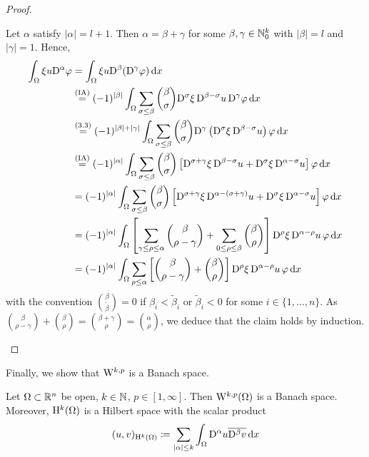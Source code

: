 \begin{proof}
\begin{enumerate}
      Let $\alpha$ satisfy $|\alpha| = l+1$.
      Then $\alpha  = \beta + \gamma$ for some $\beta, \gamma \in \mathbb{N}_0^k$ with $|\beta| = l$ and $|\gamma| = 1$.
      Hence,
      \begin{align*}
        \int_\Omega \xi u \mathrm{D}^\alpha \varphi
        &= \int_\Omega \xi u\mathrm{D}^\beta (\mathrm{D}^\gamma \varphi ) \, {\operatorname{d}\!{x}} \\
        &\overset{\mathrm{(IA)}}{=} (-1)^{|\beta|} \int_\Omega \sum_{\sigma \leq \beta} \binom{\beta}{\sigma} \mathrm{D}^\sigma \xi\, \mathrm{D}^{\beta - \sigma} u\, \mathrm{D}^\gamma \varphi \, {\operatorname{d}\!{x}} \\
        &\overset{(3.3)}{=} (-1)^{|\beta|+|\gamma|} \int_\Omega \sum_{\sigma \leq \beta} \binom{\beta}{\sigma} \mathrm{D}^\gamma \left( \mathrm{D}^\sigma \xi \, \mathrm{D}^{\beta - \sigma} u \right) \varphi \, {\operatorname{d}\!{x}} \\
        &\overset{\mathrm{(IA)}}{=} (-1)^{|\alpha|} \int_\Omega \sum_{\sigma \leq \beta} \binom{\beta}{\sigma} \left[ \mathrm{D}^{\sigma + \gamma} \xi\, \mathrm{D}^{\beta - \sigma} u + \mathrm{D}^\sigma \xi \,\mathrm{D}^{\alpha - \sigma} u \right] \varphi \, {\operatorname{d}\!{x}}\\
        &= (-1)^{|\alpha|} \int_\Omega \sum_{\sigma \leq \beta} \binom{\beta}{\sigma} \left[ \mathrm{D}^{\sigma + \gamma} \xi\, \mathrm{D}^{\alpha - (\sigma + \gamma)} u + \mathrm{D}^\sigma \xi \,\mathrm{D}^{\alpha - \sigma} u \right] \varphi \, {\operatorname{d}\!{x}}\\
        &= (-1)^{|\alpha|} \int_\Omega \left [\sum_{\gamma \leq \rho \leq \alpha} \binom{\beta}{\rho - \gamma} + \sum_{0 \leq \rho \leq \beta} \binom{\beta}{\rho} \right] \mathrm{D}^\rho \xi \,\mathrm{D}^{\alpha - \rho}u \, \varphi \, {\operatorname{d}\!{x}} \\
        &= (-1)^{|\alpha|} \int_\Omega \sum_{\rho \leq \alpha} \left[ \binom{\beta}{\rho - \gamma} + \binom{\beta }{\rho}\right] \mathrm{D}^\rho \xi \, \mathrm{D}^{\alpha - \rho} u \, \varphi \, {\operatorname{d}\!{x}}
      \end{align*}
      with the convention $\binom{\beta}{\tilde\beta} = 0$ if $\beta_i < \tilde \beta_i$ or $\tilde \beta_i < 0$ for some $i \in \{1,\dots,n\}$.
      As $\binom{\beta}{\rho - \gamma} + \binom{\beta}{\rho} = \binom{\beta + \gamma}{\rho} = \binom{\alpha}{\rho}$, we deduce that the claim holds by induction.\qedhere
  \end{enumerate}
\end{proof}

Finally, we show that $\mathrm{W}^{k,p}$ is a Banach space.

\begin{thm}
  Let $\Omega \subset \mathbb{R}^n$ be open, $k \in \mathbb{N}$, $p \in [1,\infty]$.
  Then $\mathrm{W}^{k,p}(\Omega)$ is a Banach space.
  Moreover, $\mathrm{H}^k(\Omega)$ is a Hilbert space with the scalar product
  $$
  (u,v)_{\mathrm{H}^k(\Omega)} \coloneqq \sum_{|\alpha| \leq k} \int_\Omega \mathrm{D}^\alpha u \overline{\mathrm{D}^\beta v} \, {\operatorname{d}\!{x}}
  $$
\end{thm}

